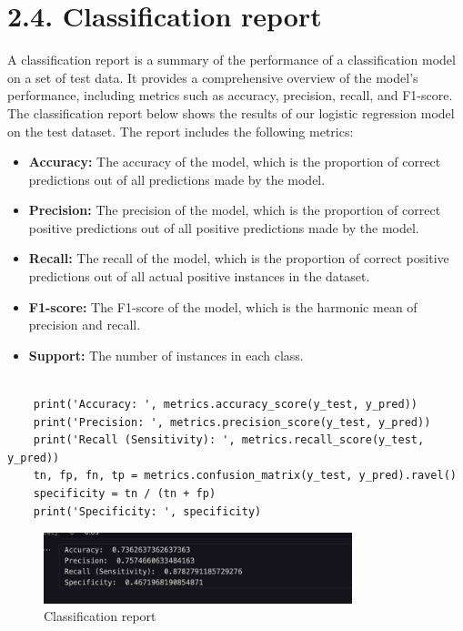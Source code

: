 \documentclass{report}
\begin{document}
\pagebreak

\section*{2.4. Classification report}
A classification report is a summary of the performance of a classification model on a set of test data. It provides a comprehensive overview of the model's performance, including metrics such as accuracy, precision, recall, and F1-score. The classification report below shows the results of our logistic regression model on the test dataset. The report includes the following metrics:

\begin{itemize}
    \item \textbf{Accuracy:} The accuracy of the model, which is the proportion of correct predictions out of all predictions made by the model.
    \item \textbf{Precision:} The precision of the model, which is the proportion of correct positive predictions out of all positive predictions made by the model.
    \item \textbf{Recall:} The recall of the model, which is the proportion of correct positive predictions out of all actual positive instances in the dataset.
    \item \textbf{F1-score:} The F1-score of the model, which is the harmonic mean of precision and recall.
    \item \textbf{Support:} The number of instances in each class.
\end{itemize}

\begin{lstlisting}

    print('Accuracy: ', metrics.accuracy_score(y_test, y_pred))
    print('Precision: ', metrics.precision_score(y_test, y_pred))
    print('Recall (Sensitivity): ', metrics.recall_score(y_test, y_pred))
    tn, fp, fn, tp = metrics.confusion_matrix(y_test, y_pred).ravel()
    specificity = tn / (tn + fp)
    print('Specificity: ', specificity)
\end{lstlisting}


\begin{figure}
    \centering
    \includegraphics[width=0.8\textwidth]{images/23.png}
    \caption{Classification report}
    \label{fig:Classification report}
\end{figure}
\end{document}

